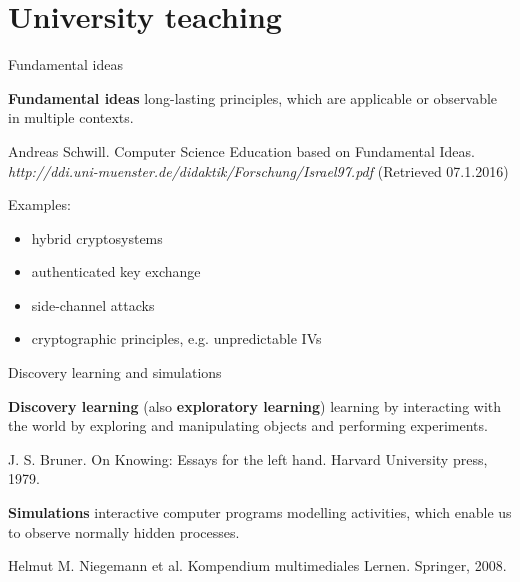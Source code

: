 \section{University teaching}
%

\begin{frame}{Fundamental ideas}

	\begin{block}{\textbf{Fundamental ideas}}
	long-lasting principles, which are applicable or observable in multiple contexts.
		\begin{flushright}
		\tiny \color{svsgrau2}Andreas Schwill. Computer Science Education based on Fundamental Ideas. \textit{http://ddi.uni-muenster.de/didaktik/Forschung/Israel97.pdf} (Retrieved 07.1.2016)
		\end{flushright}
	\end{block}
	
	Examples:

	\pause

	\begin{itemize}
		\item hybrid cryptosystems
		\pause
		\item authenticated key exchange
		\pause
		\item side-channel attacks
		\pause
		\item cryptographic principles, e.g. unpredictable IVs
	\end{itemize}
\end{frame}

\begin{frame}{Discovery learning and simulations}
	
	\begin{block}{\textbf{Discovery learning} (also \textbf{exploratory learning})}
	learning by interacting with the world by exploring and manipulating objects and performing experiments.
		\begin{flushright}
		\tiny \color{svsgrau2} J. S. Bruner. On Knowing: Essays for the left hand. Harvard University press, 1979.
		\end{flushright}
	\end{block}

\vspace{1cm}
\pause

	\begin{block}{\textbf{Simulations}}
	interactive computer programs modelling activities, which enable us to observe normally hidden processes.
		\begin{flushright}
		\tiny  \color{svsgrau2} Helmut M. Niegemann et al. Kompendium multimediales Lernen. Springer, 2008.
		\end{flushright}
	\end{block}

\end{frame}

